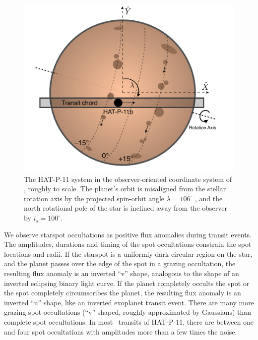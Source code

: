 \begin{figure}
\centering
\includegraphics[scale=0.8]{stsp_hat_p_11/schematic.pdf}
\caption{The HAT-P-11 system in the observer-oriented coordinate system of \citet{Fabrycky2009}, roughly to scale. The planet's orbit is misaligned from the stellar rotation axis by the projected spin-orbit angle $\lambda = 106^\circ$ \citep{Sanchis-Ojeda2011}, and the north rotational pole of the star is inclined away from the observer by $i_s = 100^\circ$.}
\label{fig:schematic}
\end{figure}

We observe starspot occultations as positive flux anomalies during transit events. The amplitudes, durations and timing of the spot occultations constrain the spot locations and radii. If the starspot is a uniformly dark circular region on the star, and the planet passes over the edge of the spot in a grazing occultation, the resulting flux anomaly is an inverted ``v'' shape, analogous to the shape of an inverted eclipsing binary light curve. If the planet completely occults the spot or the spot completely circumscribes the planet, the resulting flux anomaly is an inverted ``u'' shape, like an inverted exoplanet transit event. There are many more grazing spot occultations (``v''-shaped, roughly approximated by Gaussians) than complete spot occultations. In most \kepler\ transits of HAT-P-11, there are between one and four spot occultations with amplitudes more than a few times the noise.

